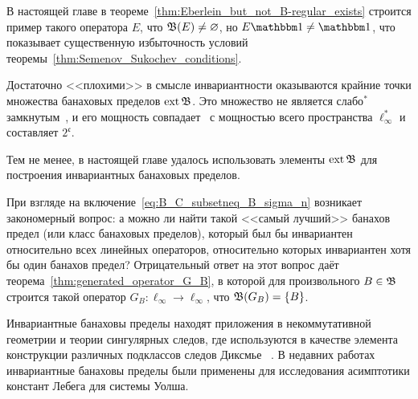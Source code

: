 В настоящей главе в теореме~\ref{thm:Eberlein_but_not_B-regular_exists}
строится пример такого оператора $E$, что $\mathfrak{B}(E)\ne\varnothing$,
но $E\one \ne \one$, что показывает существенную избыточность условий теоремы~\ref{thm:Semenov_Sukochev_conditions}.


Достаточно <<плохими>> в смысле инвариантности оказываются крайние точки множества банаховых пределов $\operatorname{ext} \mathfrak{B}$.
Это множество не является слабо$^*$ замкнутым~\cite{Nillsen,Talagrand},
и его мощность совпадает~\cite{Chou} с мощностью всего пространства $\ell_\infty^*$
и составляет $2^{\mathfrak c}$.


Тем не менее, в настоящей главе удалось использовать элементы $\operatorname{ext}\mathfrak{B}$ для построения инвариантных банаховых пределов.

При взгляде на включение~\eqref{eq:B_C_subsetneq_B_sigma_n} возникает закономерный вопрос:
а можно ли найти такой <<самый лучший>> банахов предел (или класс банаховых пределов),
который был бы инвариантен относительно всех линейных операторов,
относительно которых инвариантен хотя бы один банахов предел?
Отрицательный ответ на этот вопрос даёт теорема~\ref{thm:generated_operator_G_B}, в которой
для произвольного $B\in \mathfrak{B}$ строится такой оператор $G_B:\ell_\infty \to \ell_\infty$,
что $\mathfrak{B}(G_B) = \{B\}$.

Инвариантные банаховы пределы находят приложения в некоммутативной геометрии
и теории сингулярных следов, где используются в качестве элемента конструкции
различных подклассов следов Диксмье
~\cite{carey2003spectral,lord2012singular,sukochev2015characterization,sukochev2016dixmier}.
В недавних работах~\cite{astashkin2015constants_rus_DAN,astashkin2016constants_rus_SMJ} инвариантные банаховы пределы были применены для исследования
асимптотики констант Лебега для системы Уолша.

